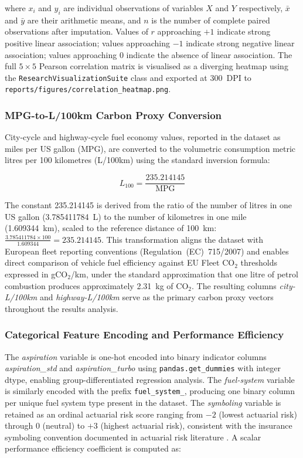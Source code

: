 \documentclass[conference]{IEEEtran}
\begin{document}
\noindent where $x_i$ and $y_i$ are individual observations of
variables $X$ and $Y$ respectively, $\bar{x}$ and $\bar{y}$ are
their arithmetic means, and $n$ is the number of complete paired
observations after imputation. Values of $r$ approaching $+1$ indicate
strong positive linear association; values approaching $-1$ indicate
strong negative linear association; values approaching $0$ indicate
the absence of linear association. The full $5 \times 5$ Pearson
correlation matrix is visualised as a diverging heatmap using the
\texttt{ResearchVisualizationSuite} class and exported at 300~DPI to
\texttt{reports/figures/correlation\_heatmap.png}.

\subsubsection{MPG-to-L/100km Carbon Proxy Conversion}

City-cycle and highway-cycle fuel economy values, reported in the
dataset as miles per US gallon (MPG), are converted to the volumetric
consumption metric litres per 100 kilometres (L/100km) using the
standard inversion formula:

\begin{equation}
L_{100} = \frac{235.214145}{\mathrm{MPG}}
\label{eq:mpg_convert}
\end{equation}

\noindent The constant 235.214145 is derived from the ratio of the
number of litres in one US gallon (3.785411784~L) to the number of
kilometres in one mile (1.609344~km), scaled to the reference distance
of 100~km:
$\frac{3.785411784 \times 100}{1.609344} = 235.214145$.
This transformation aligns the dataset with European fleet reporting
conventions (Regulation~(EC)~715/2007) and enables direct comparison
of vehicle fuel efficiency against EU Fleet CO$_2$ thresholds expressed
in gCO$_2$/km, under the standard approximation that one litre of
petrol combustion produces approximately 2.31~kg of CO$_2$.
The resulting columns \textit{city-L/100km} and
\textit{highway-L/100km} serve as the primary carbon proxy vectors
throughout the results analysis.

\subsubsection{Categorical Feature Encoding and Performance Efficiency}

The \textit{aspiration} variable is one-hot encoded into binary
indicator columns \textit{aspiration\_std} and \textit{aspiration\_turbo}
using \texttt{pandas.get\_dummies} with integer dtype, enabling
group-differentiated regression analysis. The \textit{fuel-system}
variable is similarly encoded with the prefix \texttt{fuel\_system\_},
producing one binary column per unique fuel system type present in
the dataset. The \textit{symboling} variable is retained as an
ordinal actuarial risk score ranging from $-2$ (lowest actuarial risk)
through $0$ (neutral) to $+3$ (highest actuarial risk), consistent
with the insurance symboling convention documented in actuarial
risk literature \cite{rosenfield1994automobile}. A scalar performance
efficiency coefficient is computed as:
\end{document}
